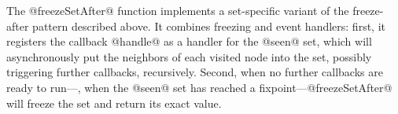 \singlespacing

\doublespacing


The @freezeSetAfter@ function implements a set-specific variant of the
freeze-after pattern described above.  It combines freezing and
event handlers: first, it registers the callback @handle@ as a handler
for the @seen@ set, which will asynchronously put the neighbors of
each visited node into the set, possibly triggering further callbacks,
recursively.  Second, when no further callbacks are ready to
run---\ie, when the @seen@ set has reached a
fixpoint---@freezeSetAfter@ will freeze the set and return its exact
value.
